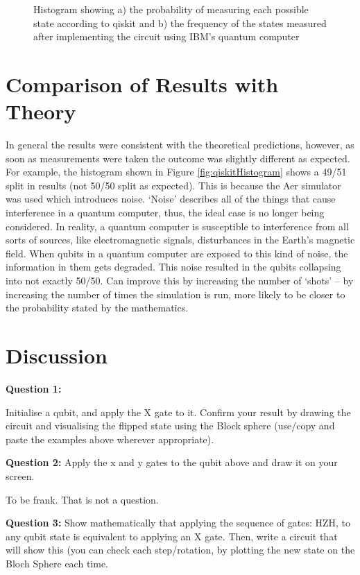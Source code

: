 \begin{figure}[h]
\begin{subfigure}[h]{0.43\textwidth}
        \caption{} 
        \label{fig:ibmHistogram}
    \end{subfigure}
    \caption{Histogram showing a) the probability of measuring each possible state according to qiskit and b) the frequency of the states measured after implementing the circuit using IBM's quantum computer} 
    \label{fig:hisogram}
\end{figure}

\section{Comparison of Results with Theory} \label{sec:comparison}

In general the results were consistent with the theoretical predictions, however, as soon as measurements were taken the outcome was slightly different as expected. For example, the histogram shown in Figure \ref{fig:qiskitHistogram} shows a 49/51 split in results (not 50/50 split as expected). This is because the Aer simulator was used which introduces noise. `Noise' describes all of the things that cause interference in a quantum computer, thus, the ideal case is no longer being considered. In reality, a quantum computer is susceptible to interference from all sorts of sources, like electromagnetic signals, 
disturbances in the Earth’s magnetic field. When qubits in a quantum computer are exposed to this kind of noise, the information in them gets degraded. This noise resulted in the qubits collapsing into not exactly 50/50. Can improve this by increasing the number of `shots' -- by increasing the number of times the simulation is run, more likely to be closer to the probability stated by the mathematics. 


\section{Discussion} \label{sec:discussion}
\textbf{Question 1:}

Initialise a qubit, and apply the X gate to it. Confirm your result by drawing the circuit and visualising the flipped state using the Block sphere (use/copy and paste the examples above wherever appropriate).


\textbf{Question 2:}
Apply the x and y gates to the qubit above and draw it on your screen.

To be frank. That is not a question.

\textbf{Question 3:}
Show mathematically that applying the sequence of gates: HZH, to any qubit state is equivalent to applying an X gate. Then, write a circuit that will show this (you can check each step/rotation, by plotting the new state on the Bloch Sphere each time.


